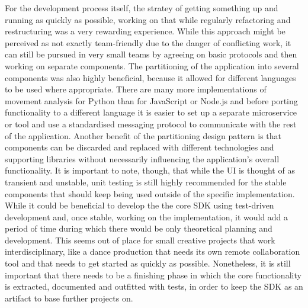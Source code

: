 For the development process itself, the stratey of getting something up and running as quickly as possible, working on that while regularly refactoring and restructuring was a very rewarding experience.
While this approach might be perceived as not exactly team-friendly due to the danger of conflicting work, it can still be pursued in very small teams by agreeing on basic protocols and then working on separate components.
The partitioning of the application into several components was also highly beneficial, because it allowed for different languages to be used where appropriate.
There are many more implementations of movement analysis for Python than for JavaScript or Node.js and before porting functionality to a different language it is easier to set up a separate microservice or tool and use a standardised messaging protocol to communicate with the rest of the application.
Another benefit of the partitioning design pattern is that components can be discarded and replaced with different technologies and supporting libraries without necessarily influencing the application's overall functionality.
It is important to note, though, that while the \ac{UI} is thought of as transient and unstable, unit testing is still highly recommended for the stable components that should keep being used outside of the specific implementation.
While it could be beneficial to develop the the core \ac{SDK} using test-driven development and, once stable, working on the implementation, it would add a period of time during which there would be only theoretical planning and development.
This seems out of place for small creative projects that work interdisciplinary, like a dance production that needs its own remote collaboration tool and that needs to get started as quickly as possible.
Nonetheless, it is still important that there needs to be a finishing phase in which the core functionality is extracted, documented and outfitted with tests, in order to keep the \ac{SDK} as an artifact to base further projects on.
